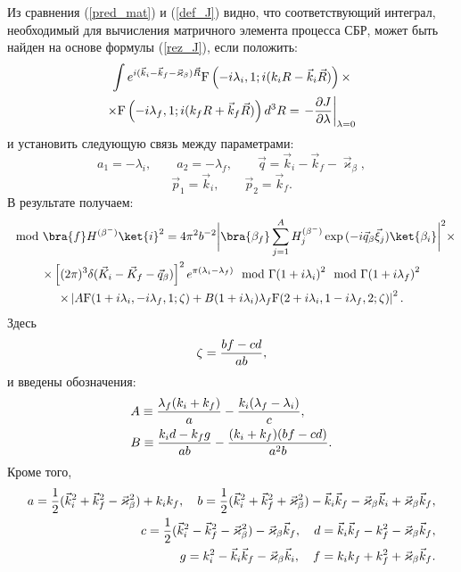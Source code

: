 Из сравнения (\ref{pred_mat}) и (\ref{def_J}) видно, что соответствующий интеграл,
необходимый для вычисления матричного  элемента процесса СБР, может
быть найден на основе формулы (\ref{rez_J}), если положить:
\begin{multline*}
\int e^{i(\vec k_i - \vec k_f -  \vec \varkappa_\beta)\vec R}
{\rm F} \left(-i \lambda_i,1;i(k_i R - \vec k_i \vec R)\right)\times\\
\times{\rm F} \left(-i \lambda_f,1;i(k_f R + \vec k_f \vec R)\right) d^3 R=
\left.-{{\partial J}\over{\partial \lambda}}\right|_{\lambda=0}
\end{multline*}
и установить следующую связь между параметрами:
$$
a_1=-\lambda_i, \qquad a_2=-\lambda_f, \qquad \vec q= \vec k_i - \vec k_f - \vec \varkappa_\beta,
$$
$$
\vec p_1 =\vec k_i,  \qquad \vec p_2 =\vec k_f.
$$
В результате получаем:
\begin{multline}\label{mat^2}
\mod{\bra{f} H^{(\beta^-)}\ket{i}}^2
=4\pi^2b^{-2}\bigg| \bra{\beta_f } \sum_{j=1}^A H^{(\beta^-)}_{j}\exp{(-i\vec q_\beta\vec\xi_{j})}
\ket{ \beta_i}\bigg|^2
\times\\
\times
\left[(2\pi)^3 \delta (\vec K_i - \vec K_f - \vec q_\beta)\right]^2
e^{{\pi} (\lambda_i - \lambda_f)}{{\mod{\Gamma{(1+i\lambda_i)}}^2
\mod{\Gamma{(1+i\lambda_f)}}^2}} \\
\times \left| A
{\rm F} (1+i \lambda_i,-i \lambda_f,1;\zeta)
+B
(1+i \lambda_i)\lambda_f {\rm F} (2+i \lambda_i,1-i \lambda_f,2;\zeta)
 \right|^2.
\end{multline}
Здесь
\begin{eqnarray}\label{zeta}
\zeta={{b f - c d}\over{ab}},
\end{eqnarray}
и введены обозначения:
\begin{equation}\label{AB}
\begin{split}
&A \equiv {{\lambda_f(k_i+k_f)}\over{a}}-{{k_i(\lambda_f-\lambda_i)}\over{c}},\\
&B \equiv {{k_i d-k_f g}\over{ab}}-{{(k_i+k_f)(b f-c d)}\over{a^2 b}}.
\end{split}
\end{equation}
Кроме того,
\begin{eqnarray}
a={1\over2}(\vec k_i^2+\vec k_f^2-\vec \varkappa_\beta^2)+k_i k_f,
\quad b={1\over2}(\vec k_i^2+\vec k_f^2+\vec \varkappa_\beta^2)-\vec k_i \vec k_f
-\vec \varkappa_\beta\vec k_i+\vec \varkappa_\beta\vec k_f,\nonumber\\
c={1\over2}(\vec k_i^2-\vec k_f^2-\vec \varkappa_\beta^2)- \vec \varkappa_\beta \vec k_f,
\quad d=\vec k_i \vec k_f-k_f^2-\vec \varkappa_\beta\vec k_f,\nonumber\\
g=k_i^2-\vec k_i \vec k_f-\vec \varkappa_\beta\vec k_i,
\quad f= k_i k_f+k_f^2+\vec \varkappa_\beta\vec k_f\nonumber.
\end{eqnarray}

